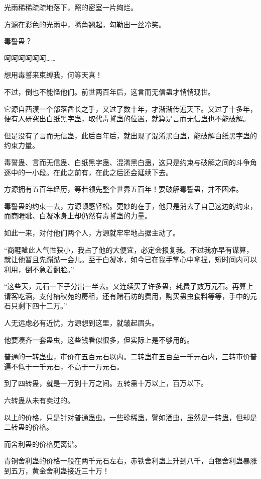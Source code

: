 \begin{this_body}
光雨稀稀疏疏地落下，照的密室一片绚烂。

方源在彩色的光雨中，嘴角翘起，勾勒出一丝冷笑。

毒誓蛊？

呵呵呵呵呵呵……

想用毒誓来束缚我，何等天真！

不过，倒也不能怪他们。前世两百年后，这言而无信蛊才悄悄现世。

它源自西漠一个部落酋长之手，又过了数十年，才渐渐传遍天下。又过了十多年，便有人研究出白纸黑字蛊，取代毒誓蛊的位置，就算是言而无信蛊也不能破解。

但是没有了言而无信蛊，此后百年后，就出现了混淆黑白蛊，能破解白纸黑字蛊的约束力量。

毒誓蛊、言而无信蛊、白纸黑字蛊、混淆黑白蛊，这只是约束与破解之间的斗争角逐中的一小段。在此之前有，在此之后还会延续下去。

方源拥有五百年经历，等若领先整个世界五百年！要破解毒誓蛊，并不困难。

毒誓蛊的约束一去，方源顿感轻松。更妙的在于，他只是消去了自己这边的约束，而商睚眦、白凝冰身上却仍然有毒誓蛊的力量。

如此一来，对付他们两个人，方源就牢牢地占据主动了。

“商睚眦此人气性狭小，我占了他的大便宜，必定会报复我。不过我亦早有谋算，就让他暂且先蹦跶一会儿。至于白凝冰，如今已在我手掌心中拿捏，短时间内可以利用，倒不急着翻脸。”

“这些天，元石一下子分出一半去。又连续买了许多蛊，耗费了数万元石。再算上请客吃酒，支付楠秋苑的房租，还有赌石坊的费用，购买蛊虫食料等等，手中的元石只剩下四十二万。”

人无远虑必有近忧，方源想到这里，就皱起眉头。

他要凑齐一套蛊虫，这些钱看似很多，但实际上是不够用的。

普通的一转蛊虫，市价在五百元石以内。二转蛊在五百至一千元石内，三转市价普遍不低于一千元石，不高于一万元石。

到了四转蛊，就是一万到十万之间。五转蛊十万以上，百万以下。

六转蛊从未有卖过的。

以上的价格，只是针对普通蛊虫。一些珍稀蛊，譬如酒虫，虽然是一转蛊，但却是二转蛊的价格。

而舍利蛊的价格更离谱。

青铜舍利蛊的价格一般在两千元石左右，赤铁舍利蛊上升到八千，白银舍利蛊暴涨到五万，黄金舍利蛊接近三十万！


\end{this_body}

